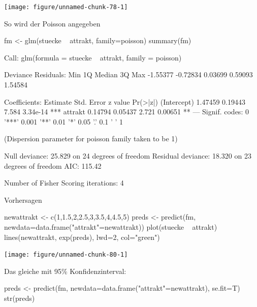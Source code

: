 \documentclass[a4paper,twoside]{tufte-book}\usepackage[]{graphicx}\usepackage[]{color}
\begin{document}
\begin{appendices}
\begin{Schunk}
\texttt{[image: figure/unnamed-chunk-78-1]} \end{Schunk}


So wird der Poisson angegeben

\begin{Schunk}
\begin{Sinput}
fm <- glm(stuecke ~ attrakt, family=poisson)
summary(fm)
\end{Sinput}
\begin{Soutput}

Call:
glm(formula = stuecke ~ attrakt, family = poisson)

Deviance Residuals: 
     Min        1Q    Median        3Q       Max  
-1.55377  -0.72834   0.03699   0.59093   1.54584  

Coefficients:
            Estimate Std. Error z value Pr(>|z|)    
(Intercept)  1.47459    0.19443   7.584 3.34e-14 ***
attrakt      0.14794    0.05437   2.721  0.00651 ** 
---
Signif. codes:  0 '***' 0.001 '**' 0.01 '*' 0.05 '.' 0.1 ' ' 1

(Dispersion parameter for poisson family taken to be 1)

    Null deviance: 25.829  on 24  degrees of freedom
Residual deviance: 18.320  on 23  degrees of freedom
AIC: 115.42

Number of Fisher Scoring iterations: 4
\end{Soutput}
\end{Schunk}

Vorhersagen

\begin{Schunk}
\begin{Sinput}
newattrakt <- c(1,1.5,2,2.5,3,3.5,4,4.5,5)
preds <- predict(fm, newdata=data.frame("attrakt"=newattrakt))
plot(stuecke ~ attrakt)
lines(newattrakt, exp(preds), lwd=2, col="green")
\end{Sinput}

\texttt{[image: figure/unnamed-chunk-80-1]} \end{Schunk}

Das gleiche mit 95\% Konfidenzinterval:

\begin{Schunk}
\begin{Sinput}
preds <- predict(fm, newdata=data.frame("attrakt"=newattrakt), se.fit=T)
str(preds)
\end{Sinput}


\end{Schunk}
\end{appendices}
\end{document}
